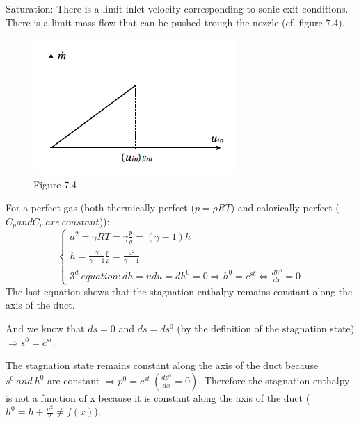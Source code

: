 Saturation: There is a limit inlet velocity corresponding to sonic exit conditions. There is a limit mass flow that can be pushed trough the nozzle (cf. figure 7.4).
\\
\begin{figure}[H]
\begin{center}
\includegraphics[scale=0.30]{ch7/chap74.png}
\caption*{Figure 7.4}
\end{center}
\end{figure}


For a perfect gas (both thermically perfect ($p=\rho RT$) and calorically perfect ($C_p and C_v \ are\ constant$)):
\begin{equation}
\left\{
    \begin{array}{l}
    a^2=\gamma RT=\gamma \frac{p}{\rho}=(\gamma -1)h \\
    h=\frac{\gamma}{\gamma-1}\frac{p}{\rho}=\frac{a^2}{\gamma-1} \\
    3^d \ equation: dh=udu=dh^0=0 \Rightarrow h^0=c^{st} \Leftrightarrow \frac{dh^0}{dx}=0
    \end{array}
\right.
\end{equation}
The last equation shows that the stagnation enthalpy remains constant along the axis of the duct.

And we know that $ds=0$ and $ds=ds^0$ (by the definition of the stagnation state) $\Rightarrow s^0=c^{st}$.

The stagnation state remains constant along the axis of the duct because $s^0 \ and\ h^0$ are constant $\Rightarrow p^0=c^{st}\  (\frac{dp^0}{dx}=0)$. Therefore the stagnation enthalpy is not a function of x because it is constant along the axis of the duct ($h^0=h+\frac{u^2}{2} \neq f(x)$).
\\


